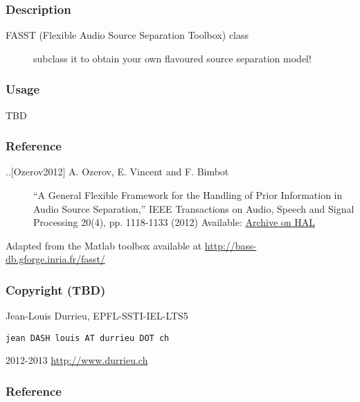\documentclass[letterpaper,10pt,english]{sphinxmanual}
\begin{document}
\subsubsection{Description}
\label{reference/audiomodel:description}\begin{description}
\item[{FASST (Flexible Audio Source Separation Toolbox) class}] \leavevmode
subclass it to obtain your own flavoured source separation model!

\end{description}


\subsubsection{Usage}
\label{reference/audiomodel:usage}
TBD


\subsubsection{Reference}
\label{reference/audiomodel:reference}\begin{description}
\item[{..{[}Ozerov2012{]} A. Ozerov, E. Vincent and F. Bimbot}] \leavevmode
``A General Flexible Framework for the Handling of Prior Information
in Audio Source Separation,'' 
IEEE Transactions on Audio, Speech and Signal Processing 20(4),
pp. 1118-1133 (2012)                            
Available: \href{http://hal.inria.fr/hal-00626962/}{Archive on HAL}

\end{description}

Adapted from the Matlab toolbox available at
\href{http://bass-db.gforge.inria.fr/fasst/}{http://bass-db.gforge.inria.fr/fasst/}


\subsubsection{Copyright (TBD)}
\label{reference/audiomodel:copyright-tbd}
Jean-Louis Durrieu, EPFL-SSTI-IEL-LTS5

\begin{Verbatim}[commandchars=\\\{\}]
jean DASH louis AT durrieu DOT ch
\end{Verbatim}

2012-2013
\href{http://www.durrieu.ch}{http://www.durrieu.ch}


\subsubsection{Reference}
\label{reference/audiomodel:id1}
\end{document}
